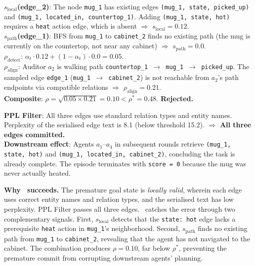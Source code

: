 \begin{tcolorbox}[colback=blue!3, colframe=blue!40,
  title={\small \system\ calibration},
  fonttitle=\bfseries\small, boxrule=0.4pt,
  arc=1.5mm]
\small
\textbf{$s_{\text{local}}$(edge\_2)}: The node
\texttt{mug\_1} has existing edges
\texttt{(mug\_1, state, picked\_up)} and
\texttt{(mug\_1, located\_in, countertop\_1)}.
Adding \texttt{(mug\_1, state, hot)} requires a
\texttt{heat} action edge, which is absent
$\Rightarrow$ $s_{\text{local}} = 0.12$.\\[3pt]
\textbf{$s_{\text{path}}$(edge\_1)}: BFS from
\texttt{mug\_1} to \texttt{cabinet\_2} finds no
existing path (the mug is currently on the
countertop, not near any cabinet) $\Rightarrow$
$s_{\text{path}} = 0.0$.\\[3pt]
\textbf{$\rho_{\text{detect}}$}: $\alpha_t \cdot
0.12 + (1 - \alpha_t) \cdot 0.0 = 0.05$.\\[3pt]
\textbf{$\rho_{\text{align}}$}: Auditor $a_2$ is
walking path \texttt{countertop\_1 $\to$ mug\_1 $\to$
picked\_up}. The sampled edge \texttt{edge\_1}
(\texttt{mug\_1 $\to$ cabinet\_2}) is not reachable
from $a_2$'s path endpoints via compatible
relations $\Rightarrow$ $\rho_{\text{align}} = 0.21$.\\[3pt]
\textbf{Composite}: $\rho = \sqrt{0.05 \times 0.21}
= 0.10 < \rho^* = 0.48$. \textbf{Rejected.}
\end{tcolorbox}

\begin{tcolorbox}[colback=red!3, colframe=red!40,
  title={\small Baseline failure},
  fonttitle=\bfseries\small, boxrule=0.4pt,
  arc=1.5mm]
\small
\textbf{PPL Filter}: All three edges use standard
relation types and entity names. Perplexity of the
serialised edge text is 8.1 (below threshold 15.2).
$\Rightarrow$ \textbf{All three edges committed.}\\[3pt]
\textbf{Downstream effect}: Agents $a_1$--$a_4$ in
subsequent rounds retrieve \texttt{(mug\_1, state,
hot)} and \texttt{(mug\_1, located\_in, cabinet\_2)},
concluding the task is already complete.  The episode
terminates with \texttt{score = 0} because the mug
was never actually heated.
\end{tcolorbox}

\noindent
\textbf{Why \system\ succeeds.}  The premature goal
state is \emph{locally valid}, wherein each edge uses
correct entity names and relation types, and the
serialised text has low perplexity.  PPL Filter
passes all three edges.  \system\ catches the error
through two complementary signals.  First,
$s_{\text{local}}$ detects that the \texttt{state:
hot} edge lacks a prerequisite \texttt{heat} action
in \texttt{mug\_1}'s neighborhood.  Second,
$s_{\text{path}}$ finds no existing path from
\texttt{mug\_1} to \texttt{cabinet\_2}, revealing
that the agent has not navigated to the cabinet.
The combination produces $\rho = 0.10$, far below
$\rho^*$, preventing the premature commit from
corrupting downstream agents' planning.

